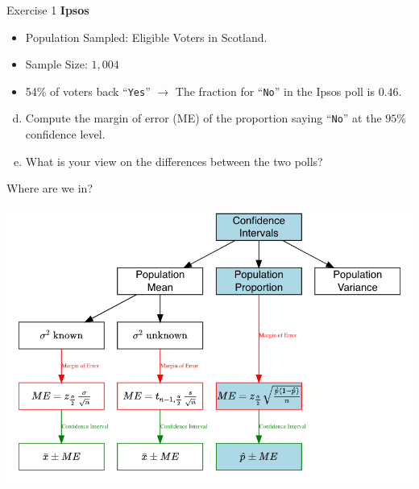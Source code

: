 \documentclass[
  11pt,
  ignorenonframetext,
]{beamer}
\providecommand{\tightlist}{%
  \setlength{\itemsep}{0pt}\setlength{\parskip}{0pt}}
\begin{document}
\begin{frame}[fragile]{Exercise 1}
\protect\hypertarget{exercise-1-1}{}
\textbf{Ipsos}

\begin{itemize}
\tightlist
\item
  Population Sampled: Eligible Voters in Scotland.
\item
  Sample Size: \(1,004\)
\item
  54\% of voters back ``\texttt{Yes}'' \(\rightarrow\) The fraction for
  ``\texttt{No}'' in the Ipsos poll is \(0.46\).
\end{itemize}

\begin{enumerate}
[(a)]
\setcounter{enumi}{3}
\tightlist
\item
  Compute the margin of error (ME) of the proportion saying
  ``\texttt{No}'' at the \(95\%\) confidence level.
\item
  What is your view on the differences between the two polls?
\end{enumerate}
\end{frame}

\begin{frame}{Where are we in?}
\protect\hypertarget{where-are-we-in}{}
\begin{center}\includegraphics[width=0.9\linewidth]{pictures/CI_BriefReview-Ex1} \end{center}
\end{frame}
\end{document}
